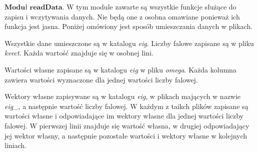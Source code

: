\vspace {3mm}
 \( \textbf{Moduł readData} \).
W tym module zawarte są wszystkie funkcje służące do zapisu i wczytywania danych. Nie będą one z osobna omawiane ponieważ ich funkcja jest jasna. Poniżej omówiony jest sposób umieszczania danych w plikach.

Wszystkie dane umieszczone są w katalogu \textit{eig}. Liczby falowe zapisane są w pliku \textit{kvect}. Każda wartość znajduje się w osobnej lini.

Wartości własne zapisane są w katalogu \textit{eig} w pliku \textit{omega}. Każda kolumna zawiera wartości wyznaczone dla jednej wartości liczby falowej.

Wektory własne zapisywane są w katalogu \textit{eig}, w plikach mających w nazwie \textit{eig\_}, a następnie wartość liczby falowej. W każdym z taikch plików zapisane są wartości własne i odpowiadające im wektory własne dla jednej wartości liczby falowej. W pierwszej linii znajduje się wartość własna, w drugiej odpowiadający jej wektor własny, a następnie pozostałe wartości i wektory własne w kolejnych liniach.